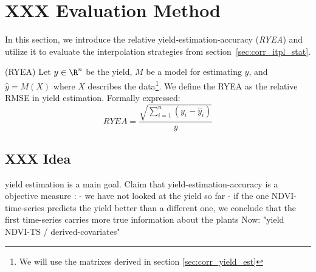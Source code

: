 \section{XXX Evaluation Method}{
    \label{sec:ndvi_corr_eval}
    In this section, we introduce the relative yield-estimation-accuracy (\textit{RYEA}) and utilize it to evaluate the interpolation strategies from section~\ref{sec:corr_itpl_stat}. 

    \begin{definition}(RYEA) 
        Let $y\in \R^n$ be the yield, $M$ be a model for estimating $y$, and $\hat y = M(X)$ where $X$ describes the data\footnote{We will use the matrixes derived in section \ref{sec:corr_yield_est}}. 
        We define the RYEA as the relative RMSE in yield estimation. Formally expressed:
        \begin{equation}
            RYEA = \frac{\sqrt{\sum_{i=1}^n(y_i - \hat y_i)}}{\bar y}
        \end{equation}
        \label{def:ryea}
    \end{definition}

    \subsection{XXX Idea}{
        yield estimation is a main goal. 
        Claim that yield-estimation-accuracy is a objective measure :
            - we have not looked at the yield so far 
            - if the one NDVI-time-series predicts the yield better than a different one, we conclude that the first time-series carries more true information about the plants
        Now: "yield ~ NDVI-TS / derived-covariates" 
    }

}
